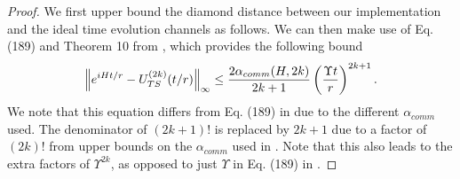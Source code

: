 \begin{proof}
    We first upper bound the diamond distance between our implementation and the ideal time evolution channels as follows.
    We can then make use of Eq. (189) and Theorem 10 from \cite{childs2021theory}, which provides the following bound
    \begin{equation}
        \norm{e^{iHt/r} - {U_{TS}^{( 2k )}}(t/r)}_{\infty} \leq \frac{2 \alpha_{comm}(H, 2k)}{2k+1} \left( \frac{\Upsilon t}{r} \right)^{2k+1}. \label{eq:TS_intermediate_2}
    \end{equation}
    We note that this equation differs from Eq. (189) in \cite{childs2021theory} due to the different $\alpha_{comm}$ used. The denominator of $(2k+1)!$ is replaced by $2k+1$ due to a factor of $(2k)!$ from upper bounds on the $\alpha_{comm}$ used in \cite{childs2021theory}. Note that this also leads to the extra factors of $\Upsilon^{2k}$, as opposed to just $\Upsilon$ in Eq. (189) in \cite{childs2021theory}.
    

\end{proof}
